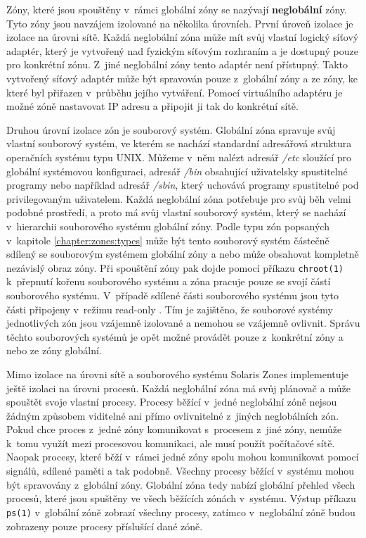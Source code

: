 Zóny, které jsou spouštěny v~rámci globální zóny se nazývají \textbf{neglobální} zóny. Tyto zóny jsou navzájem izolované na
několika úrovních. První úroveň izolace je izolace na úrovni sítě. Každá neglobální zóna může mít svůj vlastní logický síťový
adaptér, který je vytvořený nad fyzickým síťovým rozhraním a je dostupný pouze pro konkrétní zónu. Z~jiné neglobální
zóny tento adaptér není přístupný. Takto vytvořený síťový adaptér může být spravován pouze z~globální zóny a ze zóny, ke které
byl přiřazen v~průběhu jejího vytváření. Pomocí virtuálního adaptéru je možné zóně nastavovat IP adresu a připojit ji tak
do konkrétní sítě.

Druhou úrovní izolace zón je souborový systém. Globální zóna spravuje svůj vlastní souborový systém, ve kterém se nachází
standardní adresářová struktura operačních systému typu UNIX. Můžeme v~něm nalézt adresář \textit{/etc} sloužící pro globální
systémovou konfiguraci, adresář \textit{/bin} obsahující uživatelsky spustitelné programy nebo například adresář \textit{/sbin},
který uchovává programy spustitelné pod privilegovaným uživatelem. Každá neglobální zóna potřebuje pro svůj běh velmi podobné
prostředí, a proto má svůj vlastní souborový systém, který se nachází v~hierarchii souborového systému globální zóny.
Podle typu zón popsaných v~kapitole \ref{chapter:zones:types} může být tento souborový systém částečně sdílený se souborovým
systémem globální zóny a nebo může obsahovat kompletně nezávislý obraz zóny. Při spouštění zóny pak dojde pomocí příkazu
\verb|chroot(1)| k~přepnutí kořenu souborového systému a zóna pracuje pouze se svojí částí souborového systému. V~případě 
sdílené části souborového systému jsou tyto části připojeny v~režimu read-only \cite{cvut:presentation:virt1}. Tím je zajištěno,
že souborové systémy jednotlivých zón jsou vzájemně izolované a nemohou se vzájemně ovlivnit. Správu těchto souborových systémů
je opět možné provádět pouze z~konkrétní zóny a nebo ze zóny globální.

Mimo izolace na úrovni sítě a souborového systému Solaris Zones implementuje ještě izolaci na úrovni procesů. Každá neglobální
zóna má svůj plánovač a může spouštět svoje vlastní procesy. Procesy běžící v~jedné neglobální zóně nejsou žádným způsobem 
viditelné ani přímo ovlivnitelné z~jiných neglobálních zón. Pokud chce proces z~jedné zóny komunikovat s~procesem z~jiné zóny,
nemůže k~tomu využít mezi procesovou komunikaci, ale musí použít počítačové sítě. Naopak procesy, které běží v~rámci jedné
zóny spolu mohou komunikovat pomocí signálů, sdílené paměti a tak podobně. Všechny procesy běžící v~systému mohou být
spravovány z~globální zóny. Globální zóna tedy nabízí globální přehled všech procesů, které jsou spuštěny ve všech běžících
zónách v~systému. Výstup příkazu \verb|ps(1)| v~globální zóně zobrazí všechny procesy, zatímco v~neglobální zóně budou zobrazeny
pouze procesy příslušící dané zóně.
